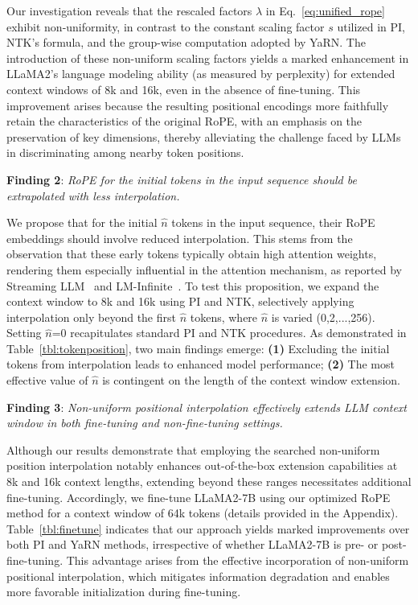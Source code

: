 Our investigation reveals that the rescaled factors $\lambda$ in Eq.~\ref{eq:unified_rope} exhibit non-uniformity, in contrast to the constant scaling factor $s$ utilized in PI, NTK's formula, and the group-wise computation adopted by YaRN. The introduction of these non-uniform scaling factors yields a marked enhancement in LLaMA2's language modeling ability (as measured by perplexity) for extended context windows of 8k and 16k, even in the absence of fine-tuning. This improvement arises because the resulting positional encodings more faithfully retain the characteristics of the original RoPE, with an emphasis on the preservation of key dimensions, thereby alleviating the challenge faced by LLMs in discriminating among nearby token positions.

\textbf{Finding 2}: \textit{RoPE for the initial tokens in the input sequence should be extrapolated with less interpolation.} 

We propose that for the initial $\hat{n}$ tokens in the input sequence, their RoPE embeddings should involve reduced interpolation. This stems from the observation that these early tokens typically obtain high attention weights, rendering them especially influential in the attention mechanism, as reported by Streaming LLM~\cite{streamingllm} and LM-Infinite~\cite{han2023lminfinite}. To test this proposition, we expand the context window to 8k and 16k using PI and NTK, selectively applying interpolation only beyond the first $\hat n$ tokens, where $\hat n$ is varied (0,2,...,256). Setting $\hat n$=0 recapitulates standard PI and NTK procedures. As demonstrated in Table~\ref{tbl:tokenposition}, two main findings emerge: \textbf{(1)} Excluding the initial tokens from interpolation leads to enhanced model performance; \textbf{(2)} The most effective value of $\hat n$ is contingent on the length of the context window extension.

\textbf{Finding 3}: \textit{Non-uniform positional interpolation effectively extends LLM context window in both fine-tuning and non-fine-tuning settings.} 

Although our results demonstrate that employing the searched non-uniform position interpolation notably enhances out-of-the-box extension capabilities at 8k and 16k context lengths, extending beyond these ranges necessitates additional fine-tuning. Accordingly, we fine-tune LLaMA2-7B using our optimized RoPE method for a context window of 64k tokens (details provided in the Appendix). Table~\ref{tbl:finetune} indicates that our approach yields marked improvements over both PI and YaRN methods, irrespective of whether LLaMA2-7B is pre- or post-fine-tuning. This advantage arises from the effective incorporation of non-uniform positional interpolation, which mitigates information degradation and enables more favorable initialization during fine-tuning.

